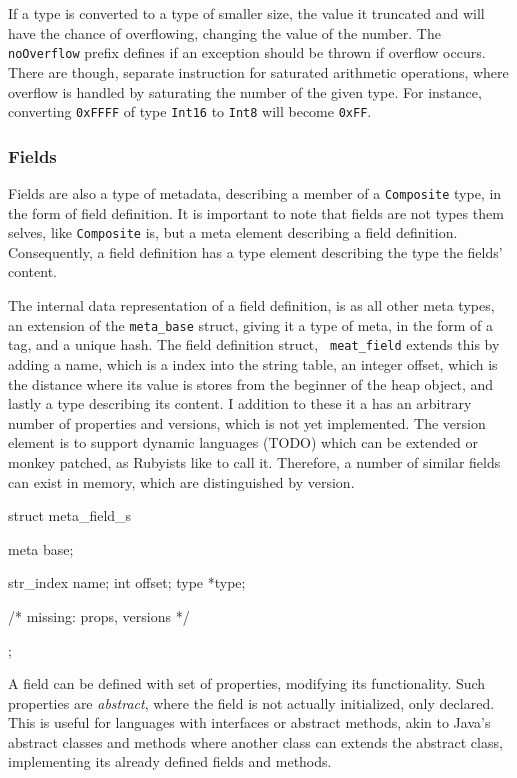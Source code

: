 If a type is converted to a type of smaller size, the value it truncated and
will have the chance of overflowing, changing the value of the number. The {\tt
  noOverflow} prefix defines if an exception should be thrown if overflow
occurs. There are though, separate instruction for saturated arithmetic
operations, where overflow is handled by saturating the number of the given
type. For instance, converting {\tt 0xFFFF} of type {\tt Int16} to {\tt Int8}
will become {\tt 0xFF}.


\subsubsection{Fields}
\label{implementation:meta:fields}

Fields are also a type of metadata, describing a member of a {\tt Composite}
type, in the form of field definition. It is important to note that fields are
not types them selves, like {\tt Composite} is, but a meta element describing a
field definition. Consequently, a field definition has a type element describing
the type the fields' content.

The internal data representation of a field definition, is as all other meta
types, an extension of the {\tt meta\_base} struct, giving it a type of meta, in
the form of a tag, and a unique hash. The field definition struct, {\tt
  meat\_field} extends this by adding a name, which is a index into the string
table, an integer offset, which is the distance where its value is stores from
the beginner of the heap object, and lastly a type describing its content. I
addition to these it a has an arbitrary number of properties and versions, which
is not yet implemented. The version element is to support dynamic languages
(TODO) which can be extended or monkey patched, as Rubyists like to call
it. Therefore, a number of similar fields can exist in memory, which are
distinguished by version. %
\begin{ccode} %
struct meta_field_s {
    meta base;

    str_index name;
    int offset;
    type *type;

    /* missing: props, versions */
};
\end{ccode}

A field can be defined with set of properties, modifying its
functionality. Such properties are {\em abstract}, where the field is not
actually initialized, only declared. This is useful for languages with
interfaces or abstract methods, akin to Java's abstract classes and methods
where another class can extends the abstract class, implementing its already
defined fields and methods.

